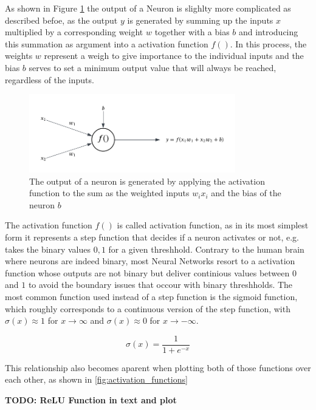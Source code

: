 As shown in Figure \ref{fig:neuron_calculations} the output of a Neuron is slighlty more complicated as described befoe, as the output $y$ is generated by summing up the inputs $x$ multiplied by a corresponding weight $w$ together with a bias $b$ and introducing this summation as argument into a activation function $f()$. In this process, the weights $w$ represent a weigh to give importance to the individual inputs and the bias $b$ serves to set a minimum output value that will always be reached, regardless of the inputs. 

\begin{figure}[h] 
	\centering
	\includegraphics[width=0.8\textwidth]{figures/modelling/perceptron_concept.png} %
	\caption{The output of a neuron is generated by applying the activation function to the sum as the weighted inputs $w_ix_i$ and the bias of the neuron $b$}
	\label{fig:neuron_calculations}
\end{figure}

The activation function $f()$ is called activation function, as in its most simplest form it represents a step function that decides if a neuron activates or not, e.g. takes the binary values ${0,1}$ for a given threshhold. Contrary to the human brain where neurons are indeed binary, most Neural Networks resort to a activation function whose outputs are not binary but deliver continious values between $0$ and $1$ to avoid the boundary issues that occour with binary threshholds. The most common function used instead of a step function is the sigmoid function, which roughly corresponds to a continuous version of the step function, with $\sigma(x) \approx 1$ for $x \to \infty$ and $\sigma(x) \approx 0$ for $x \to -\infty$.


\[
\sigma(x) = \frac{1}{1 + e^{-x}}
\]

This relationship also becomes aparent when plotting both of those functions over each other, as shown in \ref{fig:activation_functions}

\textbf{TODO: ReLU Function in text and plot}

